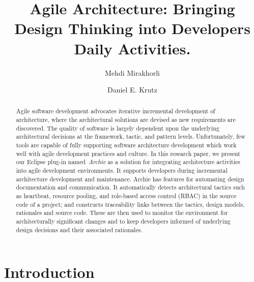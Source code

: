 \documentclass[lnbip]{svmultln}
\begin{document}
%
\mainmatter              %
%
\title{Agile Architecture: Bringing Design Thinking into Developers Daily Activities.}



\author{Mehdi Mirakhorli \and Daniel E. Krutz}



\maketitle              %

%


\begin{abstract}        %
Agile software development advocates iterative incremental development of architecture, where the architectural solutions are devised as new requirements are discovered. The quality of software is largely dependent upon the underlying architectural decisions at the framework, tactic, and pattern levels. Unfortunately, few tools are capable of fully supporting software architecture development which work well with agile development practices and culture. In this research paper, we present our Eclipse plug-in named~\emph{Archie} as a solution for integrating architecture activities into agile development environments. It supports developers during incremental architecture development and maintenance. Archie has features for automating design documentation and communication. It automatically detects architectural tactics such as heartbeat, resource pooling, and role-based access control (RBAC) in the source code of a project; and constructs traceability links between the tactics, design models, rationales and source code. These are then used to monitor the environment for architecturally significant changes and to keep developers informed of underlying design decisions and their associated rationales.

\end{abstract}
%
\section{Introduction}

\end{document}
